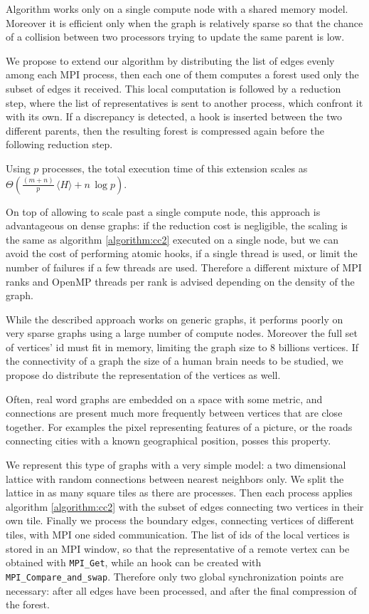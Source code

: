 Algorithm \label{algorithm:cc2} works only on a single compute node with a shared memory model.
Moreover it is efficient
only when the graph is relatively sparse so that the chance of a collision between two processors
trying to update the same parent is low.

We propose to extend our algorithm by distributing the list of edges evenly among each MPI process,
then each one of them computes a forest used only the subset of edges it received. This local
computation
is followed by a reduction step, where the list of representatives is sent to another process,
which confront it
with its own. If a discrepancy is detected, a hook is inserted between the two different parents,
then
the resulting forest is compressed again before the following reduction step.

Using $p$ processes, the total execution time of this extension scales as $\Theta(\frac{(m +
n)}{p}\, \langle H \rangle + n\,\log p)$.

On top of allowing to scale past a single compute node, this approach is advantageous on
dense graphs: if the reduction cost is negligible, the scaling is the same as algorithm
\ref{algorithm:cc2} executed on a single node,
but we can avoid the cost of performing atomic hooks, if a single thread is used, or limit the
number of failures if a few threads are used.
Therefore a different mixture of MPI ranks and OpenMP threads per rank is advised depending on the
density of the graph.

While the described approach works on generic graphs, it performs poorly on very sparse graphs using
a large number of compute nodes. Moreover the full set of vertices' id must fit in memory, limiting
the
graph size to $8$ billions vertices. If the connectivity of a graph the size of a human brain needs
to be studied,
we propose do distribute the representation of the vertices as well.

Often, real word graphs are embedded on a space with some metric, and connections are present much
more frequently between
vertices that are close together. For examples the pixel representing features of a picture, or the
roads connecting cities
with a known geographical position, posses this property.

We represent this type of graphs with a very simple model: a two dimensional lattice with random
connections between nearest neighbors
only. We split the lattice in as many square tiles as there are processes. Then each process
applies algorithm \ref{algorithm:cc2} with the subset
of edges connecting two vertices in their own tile. Finally we process the boundary edges,
connecting vertices of different tiles, with MPI
one sided communication. The list of ids of the local vertices is stored in an MPI window, so that
the representative of a remote vertex
can be obtained with \verb|MPI_Get|, while an hook can be created with \verb|MPI_Compare_and_swap|.
Therefore only two global synchronization points are necessary: after all edges have been
processed, and after the final compression
of the forest.

